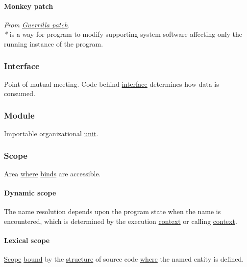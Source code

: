 \documentclass[11pt]{article}
\begin{document}
\paragraph{\label{org382198a}Monkey patch}
\label{sec:org8df5f73}
\emph{From \hyperref[org2a865ef]{Guerrilla patch}.}\\

\emph{*} is a way for program to modify supporting system software affecting only the running instance of the program.\\

\subsubsection{\label{orge564553}Interface}
\label{sec:orga1b3040}
Point of mutual meeting. Code behind \hyperref[orge564553]{interface} determines how data is consumed.\\

\subsubsection{\label{orgde475c6}Module}
\label{sec:org7c30f7a}
Importable organizational \hyperref[org2833f3f]{unit}.\\

\subsubsection{\label{orga4eed83}Scope}
\label{sec:orgae99257}
Area \hyperref[orgefd1ecd]{where} \hyperref[org4d3a6be]{binds} are accessible.\\

\paragraph{\label{org382e413}Dynamic scope}
\label{sec:orgbbecb97}
The name resolution depends upon the program state when the name is encountered, which is determined by the execution \hyperref[orgd623681]{context} or calling \hyperref[orgd623681]{context}.\\

\paragraph{\label{org8fb06f5}Lexical scope}
\label{sec:org29b370f}
\hyperref[orga4eed83]{Scope} \hyperref[org7d65bda]{bound} by the \hyperref[org93ee82c]{structure} of source code \hyperref[orgefd1ecd]{where} the named entity is defined.\\
\end{document}
